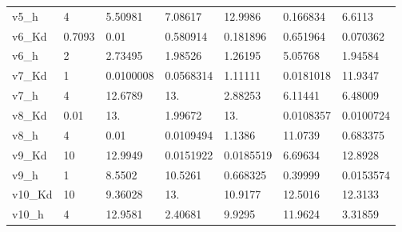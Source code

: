 \begin{tabular}{l|l|lllll}
v5\_h & 4 & 5.50981 & 7.08617 & 12.9986 & 0.166834 & 6.6113 \\ 
v6\_Kd & 0.7093 & 0.01 & 0.580914 & 0.181896 & 0.651964 & 0.070362 \\ 
v6\_h & 2 & 2.73495 & 1.98526 & 1.26195 & 5.05768 & 1.94584 \\ 
v7\_Kd & 1 & 0.0100008 & 0.0568314 & 1.11111 & 0.0181018 & 11.9347 \\ 
v7\_h & 4 & 12.6789 & 13. & 2.88253 & 6.11441 & 6.48009 \\ 
v8\_Kd & 0.01 & 13. & 1.99672 & 13. & 0.0108357 & 0.0100724 \\ 
v8\_h & 4 & 0.01 & 0.0109494 & 1.1386 & 11.0739 & 0.683375 \\ 
v9\_Kd & 10 & 12.9949 & 0.0151922 & 0.0185519 & 6.69634 & 12.8928 \\ 
v9\_h & 1 & 8.5502 & 10.5261 & 0.668325 & 0.39999 & 0.0153574 \\ 
v10\_Kd & 10 & 9.36028 & 13. & 10.9177 & 12.5016 & 12.3133 \\ 
v10\_h & 4 & 12.9581 & 2.40681 & 9.9295 & 11.9624 & 3.31859
\end{tabular}
